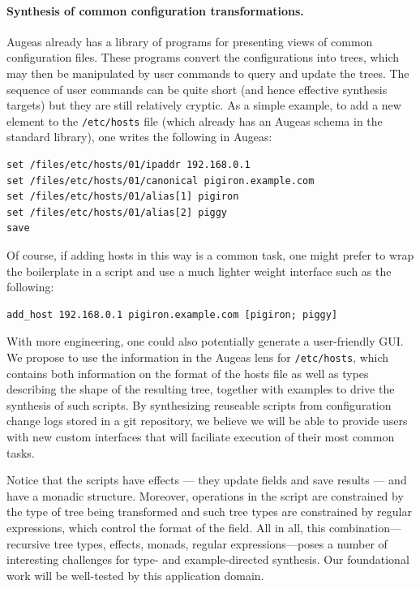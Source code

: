 \paragraph*{Synthesis of common configuration transformations.}
Augeas already has a library of programs for presenting views of 
common configuration files.  These programs convert the configurations
into trees, which may then be manipulated by user commands to query and
update the trees.  The sequence of user commands can be quite short 
(and hence effective synthesis targets) but they are
still relatively cryptic.  As a simple example, to add a new element to
the \verb+/etc/hosts+ file (which already has an Augeas schema in the
standard library), one writes the following in Augeas:
\begin{verbatim}
set /files/etc/hosts/01/ipaddr 192.168.0.1
set /files/etc/hosts/01/canonical pigiron.example.com
set /files/etc/hosts/01/alias[1] pigiron
set /files/etc/hosts/01/alias[2] piggy
save
\end{verbatim}
Of course, if adding hosts in this way is a common task, 
one might prefer to wrap the boilerplate in a script and 
use a much lighter weight interface such as the following:
\begin{verbatim}
add_host 192.168.0.1 pigiron.example.com [pigiron; piggy]
\end{verbatim}
With more engineering, one could also potentially generate a user-friendly
GUI.
We propose to use the information in the Augeas lens for  \verb+/etc/hosts+,
which contains both information on the format of the hosts file as well as 
types describing the shape of the resulting tree, together with
examples to drive the synthesis of such scripts.  By synthesizing
reuseable scripts from configuration change logs stored in a git repository,
we believe we will be able to provide users with new custom interfaces
that will faciliate execution of their most common tasks.

Notice that the scripts have
effects --- they update fields and save results --- and have a monadic
structure.  Moreover, 
operations in the script are constrained by the type of tree being 
transformed and such tree types are constrained by regular expressions,
which control the format of the field.  All in all, this combination---recursive tree types, effects, monads, regular expressions---poses
a number of interesting challenges for type- and example-directed synthesis.  
Our foundational work will be well-tested by this application domain.


